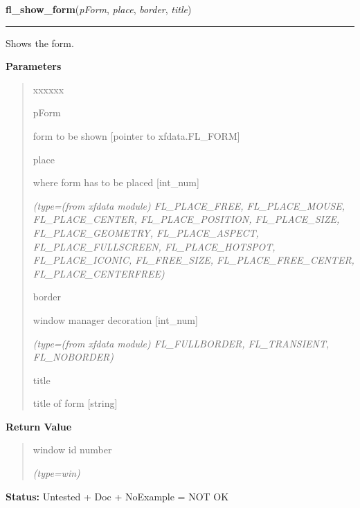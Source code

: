 \hspace{.8\funcindent}\begin{boxedminipage}{\funcwidth}

    \raggedright \textbf{fl\_show\_form}(\textit{pForm}, \textit{place}, \textit{border}, \textit{title})

    \vspace{-1.5ex}

    \rule{\textwidth}{0.5\fboxrule}
\setlength{\parskip}{2ex}
    Shows the form.

\setlength{\parskip}{1ex}
      \textbf{Parameters}
      \vspace{-1ex}

      \begin{quote}
        \begin{Ventry}{xxxxxx}

          \item[pForm]

          form to be shown [pointer to xfdata.FL\_FORM]

          \item[place]

          where form has to be placed [int\_num]

            {\it (type=(from xfdata module) FL\_PLACE\_FREE, FL\_PLACE\_MOUSE, FL\_PLACE\_CENTER, 
FL\_PLACE\_POSITION, FL\_PLACE\_SIZE, FL\_PLACE\_GEOMETRY, 
FL\_PLACE\_ASPECT, FL\_PLACE\_FULLSCREEN, FL\_PLACE\_HOTSPOT, 
FL\_PLACE\_ICONIC, FL\_FREE\_SIZE, FL\_PLACE\_FREE\_CENTER, 
FL\_PLACE\_CENTERFREE)}

          \item[border]

          window manager decoration [int\_num]

            {\it (type=(from xfdata module) FL\_FULLBORDER, FL\_TRANSIENT, FL\_NOBORDER)}

          \item[title]

          title of form [string]

        \end{Ventry}

      \end{quote}

      \textbf{Return Value}
    \vspace{-1ex}

      \begin{quote}
      window id number

      {\it (type=win)}

      \end{quote}

\textbf{Status:} Untested + Doc + NoExample = NOT OK



    \end{boxedminipage}

